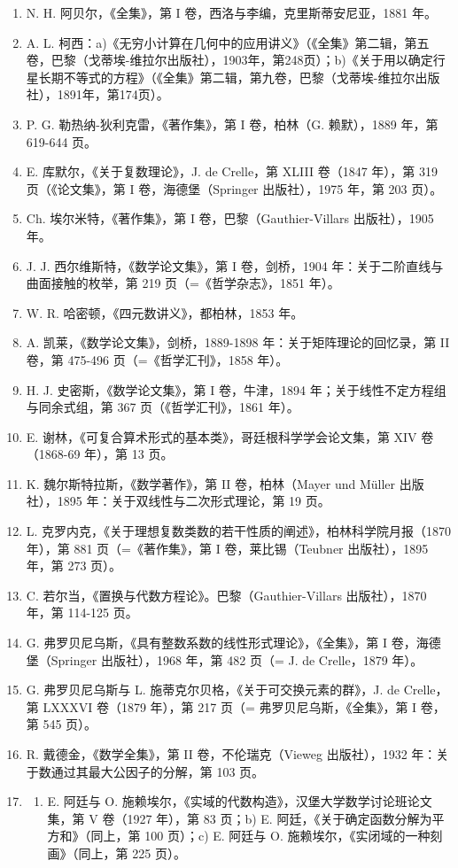 \begin{enumerate}
\def\labelenumi{(\Roman{enumi})}
\setcounter{enumi}{8}
\item
  N. H. 阿贝尔，《全集》，第 I 卷，西洛与李编，克里斯蒂安尼亚，1881 年。
\item
  A. L. 柯西：a)《无穷小计算在几何中的应用讲义》（《全集》第二辑，第五卷，巴黎（戈蒂埃-维拉尔出版社），1903年，第248页）；b)《关于用以确定行星长期不等式的方程》（《全集》第二辑，第九卷，巴黎（戈蒂埃-维拉尔出版社），1891年，第174页）。
\item
  P. G. 勒热纳-狄利克雷，《著作集》，第 I 卷，柏林（G. 赖默），1889 年，第 619-644 页。
\item
  E. 库默尔，《关于复数理论》，J. de Crelle，第 XLIII 卷（1847 年），第 319 页（《论文集》，第 I 卷，海德堡（Springer 出版社），1975 年，第 203 页）。
\item
  Ch. 埃尔米特，《著作集》，第 I 卷，巴黎（Gauthier-Villars 出版社），1905 年。
\item
  J. J. 西尔维斯特，《数学论文集》，第 I 卷，剑桥，1904 年：关于二阶直线与曲面接触的枚举，第 219 页（=《哲学杂志》，1851 年）。
\item
  W. R. 哈密顿，《四元数讲义》，都柏林，1853 年。
\item
  A. 凯莱，《数学论文集》，剑桥，1889-1898 年：关于矩阵理论的回忆录，第 II 卷，第 475-496 页（=《哲学汇刊》，1858 年）。
\item
  H. J. 史密斯，《数学论文集》，第 I 卷，牛津，1894 年；关于线性不定方程组与同余式组，第 367 页（《哲学汇刊》，1861 年）。
\item
  E. 谢林，《可复合算术形式的基本类》，哥廷根科学学会论文集，第 XIV 卷（1868-69 年），第 13 页。
\item
  K. 魏尔斯特拉斯，《数学著作》，第 II 卷，柏林（Mayer und Müller 出版社），1895 年：关于双线性与二次形式理论，第 19 页。
\item
  L. 克罗内克，《关于理想复数类数的若干性质的阐述》，柏林科学院月报（1870 年），第 881 页（=《著作集》，第 I 卷，莱比锡（Teubner 出版社），1895 年，第 273 页）。
\item
  C. 若尔当，《置换与代数方程论》。巴黎（Gauthier-Villars 出版社），1870 年，第 114-125 页。
\item
  G. 弗罗贝尼乌斯，《具有整数系数的线性形式理论》，《全集》，第 I 卷，海德堡（Springer 出版社），1968 年，第 482 页（= J. de Crelle，1879 年）。
\item
  G. 弗罗贝尼乌斯与 L. 施蒂克尔贝格，《关于可交换元素的群》，J. de Crelle，第 LXXXVI 卷（1879 年），第 217 页（= 弗罗贝尼乌斯，《全集》，第 I 卷，第 545 页）。
\item
  R. 戴德金，《数学全集》，第 II 卷，不伦瑞克（Vieweg 出版社），1932 年：关于数通过其最大公因子的分解，第 103 页。
\item
  \begin{enumerate}
  \def\labelenumii{\alph{enumii})}
  \tightlist
  \item
    E. 阿廷与 O. 施赖埃尔，《实域的代数构造》，汉堡大学数学讨论班论文集，第 V 卷（1927 年），第 83 页；b) E. 阿廷，《关于确定函数分解为平方和》（同上，第 100 页）；c) E. 阿廷与 O. 施赖埃尔，《实闭域的一种刻画》（同上，第 225 页）。
  \end{enumerate}
\end{enumerate}

